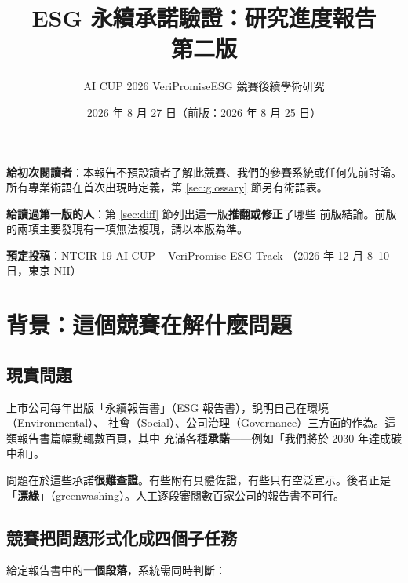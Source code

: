 \documentclass[11pt,a4paper]{ctexart}
\title{\textbf{ESG 永續承諾驗證：研究進度報告}\\[0.3em]\large 第二版}
\author{AI CUP 2026 VeriPromiseESG 競賽後續學術研究}
\date{2026 年 8 月 27 日\quad（前版：2026 年 8 月 25 日）}
\begin{document}

\maketitle

\begin{tcolorbox}[colback=gray!8, colframe=gray!50, title=閱讀說明]
\textbf{給初次閱讀者}：本報告不預設讀者了解此競賽、我們的參賽系統或任何先前討論。
所有專業術語在首次出現時定義，第 \ref{sec:glossary} 節另有術語表。

\medskip
\textbf{給讀過第一版的人}：第 \ref{sec:diff} 節列出這一版\textbf{推翻或修正}了哪些
前版結論。前版的兩項主要發現有一項無法複現，請以本版為準。
\end{tcolorbox}

\noindent\textbf{預定投稿}：NTCIR-19 AI CUP -- VeriPromise ESG Track
（2026 年 12 月 8--10 日，東京 NII）

\tableofcontents
\newpage

\section{背景：這個競賽在解什麼問題}

\subsection{現實問題}

上市公司每年出版「永續報告書」（ESG 報告書），說明自己在環境（Environmental）、
社會（Social）、公司治理（Governance）三方面的作為。這類報告書篇幅動輒數百頁，其中
充滿各種\textbf{承諾}——例如「我們將於 2030 年達成碳中和」。

問題在於這些承諾\textbf{很難查證}。有些附有具體佐證，有些只有空泛宣示。後者正是
「\textbf{漂綠}」（greenwashing）。人工逐段審閱數百家公司的報告書不可行。

\subsection{競賽把問題形式化成四個子任務}

給定報告書中的\textbf{一個段落}，系統需同時判斷：
\end{document}
